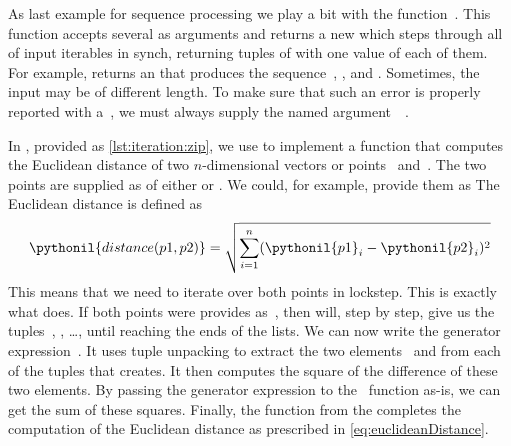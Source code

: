 %
%
%
%
%
%
\begin{sloppypar}%
As last example for sequence processing we play a bit with the  function~\cite{PSF:P3D:TPSL:BIF}.
This function accepts several  as arguments and returns a new  which steps through all of input iterables in synch, returning tuples of with one value of each of them.
For example,  returns an  that produces the sequence~, , and .
Sometimes, the input  may be of different length.
To make sure that such an error is properly reported with a~, we must always supply the named argument~~\cite{PEP618}.%
\end{sloppypar}%
%
In , provided as \cref{lst:iteration:zip}, we use  to implement a function  that computes the Euclidean distance of two $n$\nobreakdashes-dimensional vectors or points~ and~.
The two points are supplied as  of either  or .
We could, for example, provide them as 
The Euclidean distance is defined as%
%
\begin{equation}%
\pythonil{distance(p1, p2)} = \sqrt{\sum_{i=1}^n (\pythonil{p1}_i - \pythonil{p2}_i)^2}%
\label{eq:euclideanDistance}%
\end{equation}%
%
This means that we need to iterate over both points in lockstep.
This is exactly what  does.
If both points were provides as~, then  will, step by step, give us the tuples~, , {\dots}, until reaching the ends of the lists.
We can now write the generator expression~.
It uses tuple unpacking to extract the two elements~ and  from each of the tuples that  creates.
It then computes the square of the difference of these two elements.
By passing the generator expression to the~ function as-is, we can get the sum of these squares.
Finally, the  function from the  completes the computation of the Euclidean distance as prescribed in \cref{eq:euclideanDistance}.

